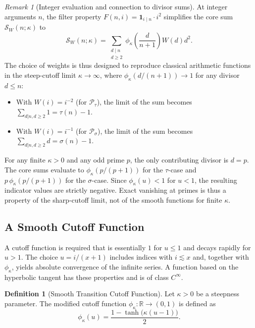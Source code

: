\documentclass[11pt,a4paper]{amsart}
\newcommand{\R}{\mathbb{R}}
\theoremstyle{plain}
\theoremstyle{definition}
\newtheorem{definition}[theorem]{Definition}
\theoremstyle{remark}
\newtheorem{remark}[theorem]{Remark}
\begin{document}
\begin{remark}[Integer evaluation and connection to divisor sums]\label{rem:integer-eval-smooth}
At integer arguments $n$, the filter property $F(n,i)=\mathbf{1}_{i \mid n} \cdot i^2$ simplifies the core sum $\mathcal{S}_W(n;\kappa)$ to
\[
\mathcal{S}_W(n;\kappa) = \sum_{\substack{d \mid n \\ d \ge 2}} \phi_{\kappa}\left(\frac{d}{n+1}\right) W(d) d^2.
\]
The choice of weights is thus designed to reproduce classical arithmetic functions in the steep-cutoff limit $\kappa\to\infty$, where $\phi_\kappa(d/(n+1))\to 1$ for any divisor $d\le n$:
\begin{itemize}
    \item With $W(i)=i^{-2}$ (for $\mathcal{P}_\tau$), the limit of the sum becomes $\sum_{d|n, d\ge2} 1 = \tau(n)-1$.
    \item With $W(i)=i^{-1}$ (for $\mathcal{P}_\sigma$), the limit of the sum becomes $\sum_{d|n, d\ge2} d = \sigma(n)-1$.
\end{itemize}
For any finite $\kappa>0$ and any odd prime $p$, the only contributing divisor is $d=p$. The core sums evaluate to $\phi_{\kappa}(p/(p+1))$ for the $\tau$-case and $p\,\phi_{\kappa}(p/(p+1))$ for the $\sigma$-case. Since $\phi_\kappa(u)<1$ for $u<1$, the resulting indicator values are strictly negative. Exact vanishing at primes is thus a property of the sharp-cutoff limit, not of the smooth functions for finite $\kappa$.
\end{remark}

\subsection{A Smooth Cutoff Function}
A cutoff function is required that is essentially $1$ for $u \le 1$ and decays rapidly for $u > 1$.
The choice $u=i/(x+1)$ includes indices with $i\lesssim x$ and, together with $\phi_\kappa$, yields absolute convergence of the infinite series.
A function based on the hyperbolic tangent has these properties and is of class $C^\infty$.
\begin{definition}[Smooth Transition Cutoff Function]
Let $\kappa>0$ be a steepness parameter. The modified cutoff function $\phi_{\kappa}\colon\R\to(0,1)$ is defined as
\begin{equation}\label{eq:phimod}
\phi_{\kappa}(u) = \frac{1 - \tanh\big(\kappa (u - 1)\big)}{2}.
\end{equation}
\end{definition}
\end{document}
